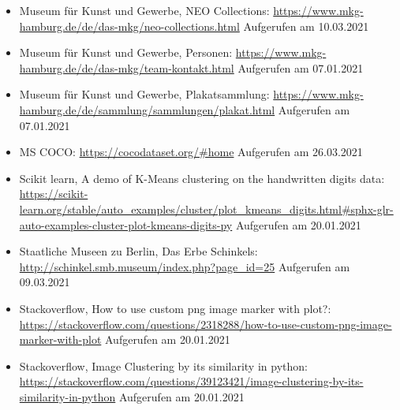 \documentclass[a4paper,12pt,ngerman]{article}
\begin{document}
\begin{itemize}
\item Museum für Kunst und Gewerbe, NEO Collections: \newline \href{https://www.mkg-hamburg.de/de/das-mkg/neo-collections.html}{https://www.mkg-hamburg.de/de/das-mkg/neo-collections.html} \newline Aufgerufen am 10.03.2021
\item Museum für Kunst und Gewerbe, Personen: \newline \href{https://www.mkg-hamburg.de/de/das-mkg/team-kontakt.html}{https://www.mkg-hamburg.de/de/das-mkg/team-kontakt.html} \newline Aufgerufen am 07.01.2021
\item Museum für Kunst und Gewerbe, Plakatsammlung: \newline \href{https://www.mkg-hamburg.de/de/sammlung/sammlungen/plakat.html}{https://www.mkg-hamburg.de/de/sammlung/sammlungen/plakat.html} \newline Aufgerufen am 07.01.2021
\item MS COCO: \newline \href{https://cocodataset.org/\#home}{https://cocodataset.org/\#home} \newline Aufgerufen am 26.03.2021
\item Scikit learn, A demo of K-Means clustering on the handwritten digits data: \newline \href{https://scikit-learn.org/stable/auto\_examples/cluster/plot\_kmeans\_digits.html\#sphx-glr-auto-examples-cluster-plot-kmeans-digits-py}{https://scikit-learn.org/stable/auto\_examples/cluster/plot\_kmeans\_digits.html\#sphx-glr-auto-examples-cluster-plot-kmeans-digits-py} \newline Aufgerufen am 20.01.2021
\item Staatliche Museen zu Berlin, Das Erbe Schinkels: \newline \href{http://schinkel.smb.museum/index.php?page_id=25}{http://schinkel.smb.museum/index.php?page\_id=25} \newline Aufgerufen am 09.03.2021
\item Stackoverflow, How to use custom png image marker with plot?: \newline \href{https://stackoverflow.com/questions/2318288/how-to-use-custom-png-image-marker-with-plot}{https://stackoverflow.com/questions/2318288/how-to-use-custom-png-image-marker-with-plot} \newline Aufgerufen am 20.01.2021
\item Stackoverflow, Image Clustering by its similarity in python: \newline \href{https://stackoverflow.com/questions/39123421/image-clustering-by-its-similarity-in-python}{https://stackoverflow.com/questions/39123421/image-clustering-by-its-similarity-in-python} \newline Aufgerufen am 20.01.2021

\end{itemize}
\end{document}
